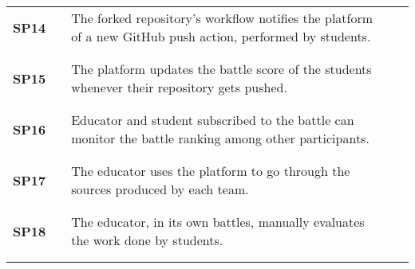 \begin{longtable}[H]{l l p{8.5cm} l l}
    \textbf{SP14}  & \vline & The forked repository's workflow notifies the platform of a new GitHub push action, performed by students.                        & \vline &                        \\
                   &        &                                                                                                                                   &        &                        \\\hline & & \\
    \textbf{SP15}  & \vline & The platform updates the battle score of the students whenever their repository gets pushed.                                      & \vline &                        \\
                   &        &                                                                                                                                   &        &                        \\\hline & & \\
    \textbf{SP16}  & \vline & Educator and student subscribed to the battle can monitor the battle ranking among other participants.                            & \vline &                        \\
                   &        &                                                                                                                                   &        &                        \\\hline & & \\
    \textbf{SP17}  & \vline & The educator uses the platform to go through the sources produced by each team.                                                   & \vline &                        \\
                   &        &                                                                                                                                   &        &                        \\\hline & & \\
    \textbf{SP18}  & \vline & The educator, in its own battles, manually evaluates the work done by students.                                                   & \vline &                        \\
                   &        &                                                                                                                                   &        &                        \\\hline & & \\

\end{longtable}
